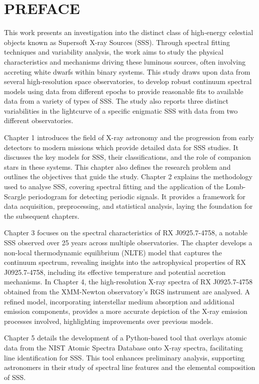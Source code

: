 \chapter*{PREFACE}
    \def\baselinestretch{1.0}
    This work presents an investigation into the distinct class of high-energy celestial objects known as Supersoft X-ray Sources (SSS). Through spectral fitting techniques and variability analysis, the work aims to study the physical characteristics and mechanisms driving these luminous sources, often involving accreting white dwarfs within binary systems. This study draws upon data from several high-resolution space observatories, to develop robust continuum spectral models using data from different epochs to provide reasonable fits to available data from a variety of types of SSS. The study also reports three distinct variabilities in the lightcurve of a specific enigmatic SSS with data from two different observatories.
    
    Chapter 1 introduces the field of X-ray astronomy and the progression from early detectors to modern missions which provide detailed data for SSS studies. It discusses the key models for SSS, their classifications, and the role of companion stars in these systems. This chapter also defines the research problem and outlines the objectives that guide the study. Chapter 2 explains the methodology used to analyse SSS, covering spectral fitting and the application of the Lomb-Scargle periodogram for detecting periodic signals. It provides a framework for data acquisition, preprocessing, and statistical analysis, laying the foundation for the subsequent chapters.
    
    Chapter 3 focuses on the spectral characteristics of RX J0925.7-4758, a notable SSS observed over 25 years across multiple observatories. The chapter develops a non-local thermodynamic equilibrium (NLTE) model that captures the continuum spectrum, revealing insights into the astrophysical properties of RX J0925.7-4758, including its effective temperature and potential accretion mechanisms. In Chapter 4, the high-resolution X-ray spectra of RX J0925.7-4758 obtained from the XMM-Newton observatory's RGS instrument are analysed. A refined model, incorporating interstellar medium absorption and additional emission components, provides a more accurate depiction of the X-ray emission processes involved, highlighting improvements over previous models.
    
    Chapter 5 details the development of a Python-based tool that overlays atomic data from the NIST Atomic Spectra Database onto X-ray spectra, facilitating line identification for SSS. This tool enhances preliminary analysis, supporting astronomers in their study of spectral line features and the elemental composition of SSS.
    
